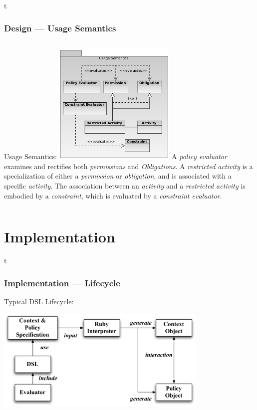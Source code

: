 \documentclass[t, 10pt]{beamer}
\begin{document}
\begin{frame}{t}
\frametitle{Design --- Usage Semantics}
\begin{columns}[t]
Usage Semantics:
\includegraphics[width=2.3in]{usage-semantics}
\pause
A \textit{policy evaluator} examines and rectifies both \textit{permissions} and \textit{Obligations}.
\newline
\newline
\pause
A \textit{restricted activity} is a specialization of either a \textit{permission} or \textit{obligation}, and is associated with a specific \textit{activity}.
\newline
\newline
\pause
The association between an \textit{activity} and a \textit{restricted activity} is embodied by a \textit{constraint}, which is evaluated by a \textit{constraint evaluator}.
\end{columns}
\end{frame}

\section{Implementation}
\begin{frame}{t}
\frametitle{Implementation --- Lifecycle}
Typical DSL Lifecycle: \\
\begin{center}
\includegraphics[width=4in]{DSL-usage}
\end{center}
\end{frame}
\end{document}
